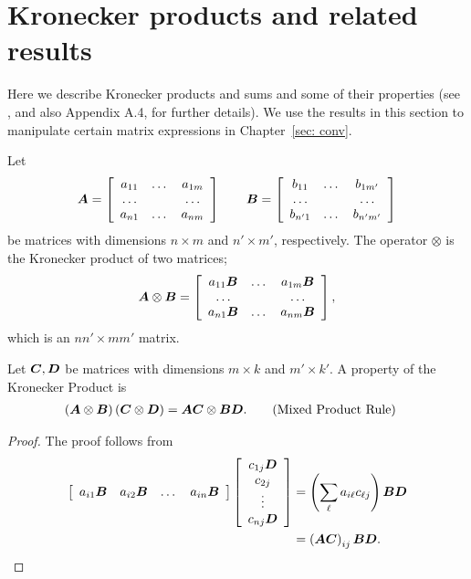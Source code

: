 \section{Kronecker products and related results}
Here we describe Kronecker products and sums and some of their properties (see \cite{MEinAP}, and also Appendix A.4, for further details). We use the results in this section to manipulate certain matrix expressions in Chapter~\ref{sec: conv}.

Let 
\[\boldsymbol A = \left[\begin{array}{ccc}a_{11} & \dots & a_{1m}\\\hdots & & \hdots \\ a_{n1}&\dots & a_{nm}\end{array}\right]
\qquad
\boldsymbol{B} = \left[\begin{array}{ccc}b_{11} & \dots & b_{1m'}\\\hdots & & \hdots \\ b_{n'1}&\dots & b_{n'm'}\end{array}\right]\]
be matrices with dimensions \(n\times m\) and \(n'\times m'\), respectively. The operator \(\otimes\) is the Kronecker product of two matrices; 
\[\boldsymbol A\otimes \boldsymbol{B} = \left[\begin{array}{ccc}a_{11}\boldsymbol{B} & \dots & a_{1m}\boldsymbol{B}\\\hdots & & \hdots \\ a_{n1}\boldsymbol{B}&\dots & a_{nm}\boldsymbol{B}\end{array}\right],\]
which is an \(nn'\times mm'\) matrix. 

Let \(\boldsymbol{C},\boldsymbol{D}\)  be matrices with dimensions \(m\times k\) and \(m'\times k'\). A property of the Kronecker Product is 
\begin{align}
	\left(\boldsymbol A\otimes \boldsymbol{B}\right)\left(\boldsymbol{C}\otimes \boldsymbol{D}\right) &= \boldsymbol A\boldsymbol{C}\otimes \boldsymbol{B}\boldsymbol{D}.\label{eqn:mpr}\tag{Mixed Product Rule}
\end{align}
\begin{proof}
	The proof follows from 
	\begin{align*}
		\left[\begin{array}{cccc}a_{i1}\boldsymbol{B} & a_{i2}\boldsymbol{B}&\dots&a_{in}\boldsymbol{B}\end{array}\right]\left[\begin{array}{c}c_{1j}\boldsymbol{D}\\c_{2j}\\\vdots\\c_{nj}\boldsymbol{D} \end{array}\right] 
		&= \left(\sum_\ell a_{i\ell}c_{\ell j}\right) \boldsymbol{B}\boldsymbol{D}
		\\&= \left(\boldsymbol A\boldsymbol{C}\right)_{ij}\boldsymbol{B}\boldsymbol{D}.
	\end{align*}
\end{proof}

